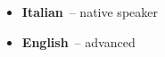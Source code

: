 \begin{itemize}
	\item \textbf{Italian}~-- native speaker \\
	\item \textbf{English}~-- advanced \\
\end{itemize}